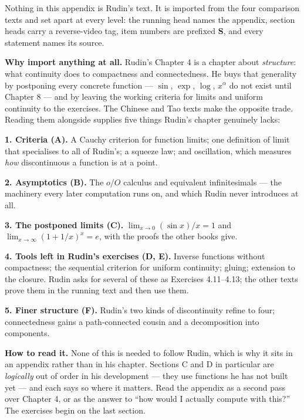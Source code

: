 
\begin{roadmap}
Nothing in this appendix is Rudin's text. It is imported from the four
comparison texts and set apart at every level: the running head names the
appendix, section heads carry a reverse-video tag, item numbers are prefixed
\textbf{S}, and every statement names its source.

\medskip
\raggedright
\textbf{Why import anything at all.} Rudin's Chapter 4 is a chapter about
\emph{structure}: what continuity does to compactness and connectedness. He
buys that generality by postponing every concrete function --- $\sin$, $\exp$,
$\log$, $x^\alpha$ do not exist until Chapter 8 --- and by leaving the
working criteria for limits and uniform continuity to the exercises. The
Chinese and Tao texts make the opposite trade. Reading them alongside
supplies five things Rudin's chapter genuinely lacks:

\medskip
\textbf{1. Criteria (A).} A Cauchy criterion for function limits; one
definition of limit that specialises to all of Rudin's; a squeeze law; and
oscillation, which measures \emph{how} discontinuous a function is at a point.

\medskip
\textbf{2. Asymptotics (B).} The $o$/$O$ calculus and equivalent
infinitesimals --- the machinery every later computation runs on, and which
Rudin never introduces at all.

\medskip
\textbf{3. The postponed limits (C).} $\lim_{x\to0}(\sin x)/x = 1$ and
$\lim_{x\to\infty}(1+1/x)^x = e$, with the proofs the other books give.

\medskip
\textbf{4. Tools left in Rudin's exercises (D, E).} Inverse functions without
compactness; the sequential criterion for uniform continuity; gluing;
extension to the closure. Rudin asks for several of these as Exercises
4.11--4.13; the other texts prove them in the running text and then use them.

\medskip
\textbf{5. Finer structure (F).} Rudin's two kinds of discontinuity refine to
four; connectedness gains a path-connected cousin and a decomposition into
components.

\medskip
\textbf{How to read it.} None of this is needed to follow Rudin, which is why
it sits in an appendix rather than in his chapter. Sections C and D in
particular are \emph{logically} out of order in his development --- they use
functions he has not built yet --- and each says so where it matters. Read
the appendix as a second pass over Chapter 4, or as the answer to ``how would
I actually compute with this?'' The exercises begin on the last section.
\end{roadmap}

